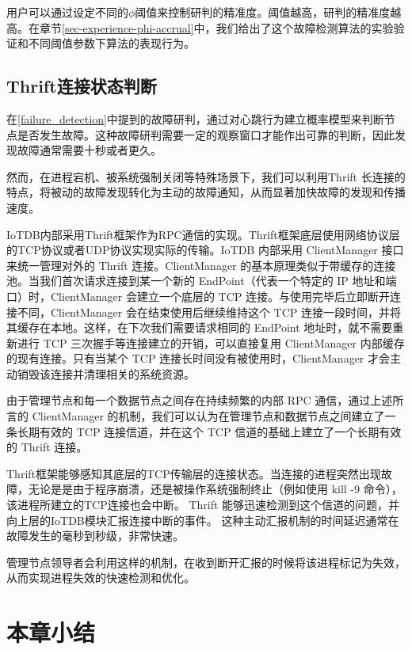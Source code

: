 用户可以通过设定不同的$\phi$阈值来控制研判的精准度。阈值越高，研判的精准度越高。在章节\ref{sec-experience-phi-accrual}中，我们给出了这个故障检测算法的实验验证和不同阈值参数下算法的表现行为。


\subsection{Thrift连接状态判断}\label{thrift-detection}

在\ref{failure_detection}中提到的故障研判，通过对心跳行为建立概率模型来判断节点是否发生故障。这种故障研判需要一定的观察窗口才能作出可靠的判断，因此发现故障通常需要十秒或者更久。

然而，在进程宕机、被系统强制关闭等特殊场景下，我们可以利用Thrift 长连接的特点，将被动的故障发现转化为主动的故障通知，从而显著加快故障的发现和传播速度。

IoTDB内部采用Thrift\cite{slee2007thrift}框架作为RPC通信的实现。Thrift框架底层使用网络协议层的TCP协议或者UDP协议实现实际的传输。IoTDB 内部采用 ClientManager 接口来统一管理对外的 Thrift 连接。ClientManager 的基本原理类似于带缓存的连接池。当我们首次请求连接到某一个新的 EndPoint（代表一个特定的 IP 地址和端口）时，ClientManager 会建立一个底层的 TCP 连接。与使用完毕后立即断开连接不同，ClientManager 会在结束使用后继续维持这个 TCP 连接一段时间，并将其缓存在本地。这样，在下次我们需要请求相同的 EndPoint 地址时，就不需要重新进行 TCP 三次握手等连接建立的开销，可以直接复用 ClientManager 内部缓存的现有连接。只有当某个 TCP 连接长时间没有被使用时，ClientManager 才会主动销毁该连接并清理相关的系统资源。

由于管理节点和每一个数据节点之间存在持续频繁的内部 RPC 通信，通过上述所言的 ClientManager 的机制，我们可以认为在管理节点和数据节点之间建立了一条长期有效的 TCP 连接信道，并在这个 TCP 信道的基础上建立了一个长期有效的 Thrift 连接。

Thrift框架能够感知其底层的TCP传输层的连接状态。当连接的进程突然出现故障，无论是是由于程序崩溃，还是被操作系统强制终止（例如使用 kill -9 命令），该进程所建立的TCP连接也会中断。
Thrift 能够迅速检测到这个信道的问题，并向上层的IoTDB模块汇报连接中断的事件。
这种主动汇报机制的时间延迟通常在故障发生的毫秒到秒级，非常快速。

管理节点领导者会利用这样的机制，在收到断开汇报的时候将该进程标记为失效，从而实现进程失效的快速检测和优化。

\section{本章小结}

